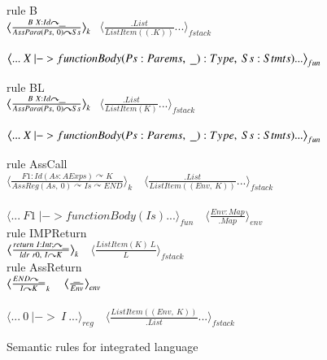 \documentclass[letterpaper, 10 pt, conference]{IEEEtran}
\begin{document}
\begin{figure}
rule B\\
$\big\langle\frac{B~X:Id\curvearrowright \underline{\hbox to 2mm{}}}{AssPara(Ps,~0)\curvearrowright Ss}\big\rangle_k$$~~~\big\langle\frac{.List}{ListItem((.K))}...\big\rangle_{fstack}$\\ \\
$\big\langle ...~ X ~|-> functionBody(Ps:Parems,~\underline{\hbox to 2mm{}}):Type,~Ss:Stmts) ...\big\rangle_{fun}\\$

rule BL\\
$\big\langle\frac{B~X:Id\curvearrowright \underline{\hbox to 2mm{}}}{AssPara(Ps,~0)\curvearrowright Ss}\big\rangle_k$$~~~\big\langle\frac{.List}{ListItem(K)}...\big\rangle_{fstack}$\\ \\
$\big\langle ...~ X ~|-> functionBody(Ps:Parems,~\underline{\hbox to 2mm{}}):Type,~Ss:Stmts) ...\big\rangle_{fun}\\$

rule AssCall\\
$\big\langle\frac{F1:Id(As:AExps)\curvearrowright K}{AssReg(As,~0)\curvearrowright Is\curvearrowright END}\big\rangle_k$
$~~~\big\langle\frac{.List}{ListItem((Env,~K))}...\big\rangle_{fstack}$\\ \\
$\big\langle ... ~F1~|->functionBody(Is) ...\big\rangle_{fun}$ $~~~\big\langle\frac{Env:Map}{.Map}\big\rangle_{env}$\\

rule IMPReturn\\
$\big\langle\frac{return~I:Int;\curvearrowright \underline{\hbox to 2mm{}}}{ldr~r0,~I\curvearrowright K}\big\rangle_k$
$~~~\big\langle\frac{ListItem(K)~L}{L}\big\rangle_{fstack}$\\

rule AssReturn\\
$\big\langle\frac{END\curvearrowright \underline{\hbox to 2mm{}}}{I\curvearrowright K}_{k}$
$~~~\big\langle\frac{\underline{\hbox to 2mm{}}}{Env}\big\rangle_{env}$\\ \\
$\big\langle ...~0~|->~I~...\big\rangle_{reg}$
$~~~\big\langle\frac{ListItem((Env,~K))}{.List} ...\big\rangle_{fstack}$


  \caption{Semantic rules for integrated language}
  \label{semantics}
\end{figure}
\end{document}
